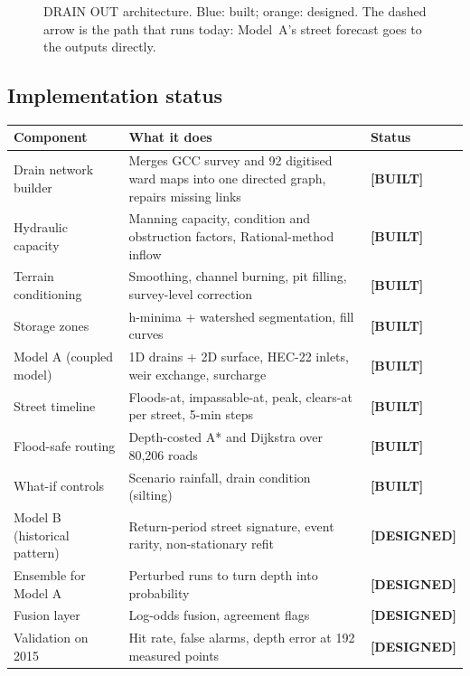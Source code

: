 \documentclass[11pt,a4paper]{article}
\newcommand{\built}{\textcolor{built}{\small\textbf{[BUILT]}}}
\newcommand{\planned}{\textcolor{planned}{\small\textbf{[DESIGNED]}}}
\begin{document}
\begin{figure}[htbp]
\caption{DRAIN OUT architecture. Blue: built; orange: designed. The dashed arrow is the
path that runs today: Model~A's street forecast goes to the outputs directly.}
\label{fig:arch}
\end{figure}

\subsection{Implementation status}

\begin{longtable}{@{}p{5.2cm}p{8.6cm}l@{}}
\toprule
\textbf{Component} & \textbf{What it does} & \textbf{Status}\\
\midrule\endhead
Drain network builder & Merges GCC survey and 92 digitised ward maps into one directed graph, repairs missing links & \built\\
Hydraulic capacity & Manning capacity, condition and obstruction factors, Rational-method inflow & \built\\
Terrain conditioning & Smoothing, channel burning, pit filling, survey-level correction & \built\\
Storage zones & h-minima + watershed segmentation, fill curves & \built\\
Model A (coupled model) & 1D drains + 2D surface, HEC-22 inlets, weir exchange, surcharge & \built\\
Street timeline & Floods-at, impassable-at, peak, clears-at per street, 5-min steps & \built\\
Flood-safe routing & Depth-costed A* and Dijkstra over 80,206 roads & \built\\
What-if controls & Scenario rainfall, drain condition (silting) & \built\\
Model B (historical pattern) & Return-period street signature, event rarity, non-stationary refit & \planned\\
Ensemble for Model A & Perturbed runs to turn depth into probability & \planned\\
Fusion layer & Log-odds fusion, agreement flags & \planned\\
Validation on 2015 & Hit rate, false alarms, depth error at 192 measured points & \planned\\
\bottomrule
\end{longtable}
\end{document}

